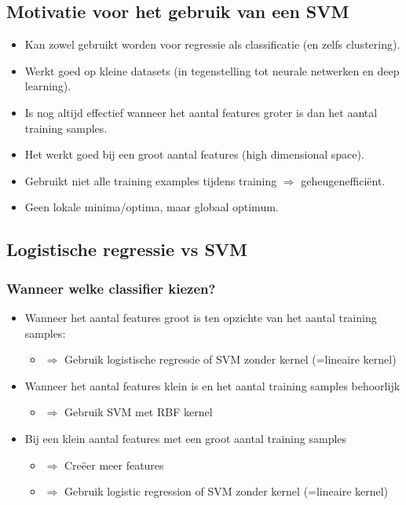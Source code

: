 \documentclass{article}
\begin{document}
\subsection{Motivatie voor het gebruik van een SVM}

\begin{itemize}
    \item Kan zowel gebruikt worden voor regressie als classificatie (en zelfs clustering).
    \item Werkt goed op kleine datasets (in tegenstelling tot neurale netwerken en deep learning).
    \item Is nog altijd effectief wanneer het aantal features groter is dan het aantal training samples.
    \item Het werkt goed bij een groot aantal features (high dimensional space).
    \item Gebruikt niet alle training examples tijdens training $\Rightarrow$ geheugenefficiënt.
    \item Geen lokale minima/optima, maar globaal optimum.
\end{itemize}

\subsection{Logistische regressie vs SVM}

\subsubsection{Wanneer welke classifier kiezen?}

\begin{itemize}
    \item Wanneer het aantal features groot is ten opzichte van het aantal training samples:
    \begin{itemize}
        \item $\Rightarrow$ Gebruik logistische regressie of SVM zonder kernel (=lineaire kernel)
    \end{itemize}
    \item Wanneer het aantal features klein is en het aantal training samples behoorlijk
    \begin{itemize}
        \item $\Rightarrow$ Gebruik SVM met RBF kernel
    \end{itemize} 
    \item Bij een klein aantal features met een groot aantal training samples
    \begin{itemize}
        \item $\Rightarrow$ Creëer meer features
        \item $\Rightarrow$ Gebruik logistic regression of SVM zonder kernel (=lineaire kernel)
    \end{itemize} 
\end{itemize}
\end{document}
